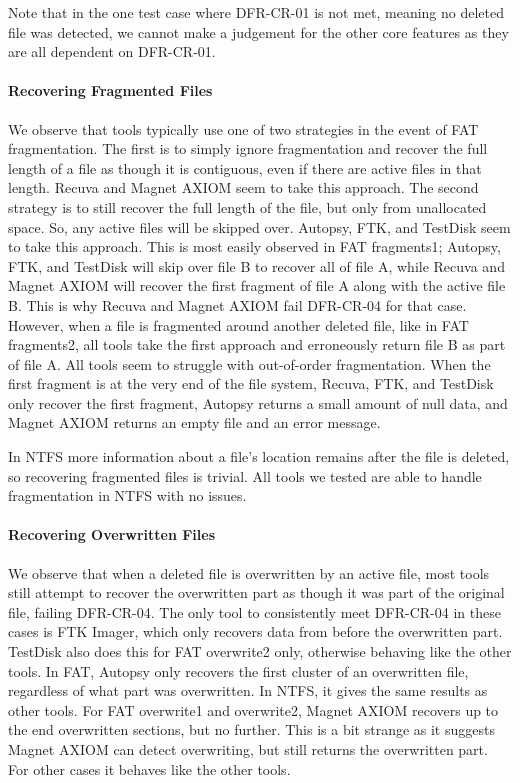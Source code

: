 Note that in the one test case where DFR-CR-01 is not met, meaning no deleted file was detected, we cannot make a judgement for the other core features as they are all dependent on DFR-CR-01.



\paragraph{Recovering Fragmented Files}
We observe that tools typically use one of two strategies in the event of FAT fragmentation.
The first is to simply ignore fragmentation and recover the full length of a file as though it is contiguous, even if there are active files in that length.
Recuva and Magnet AXIOM seem to take this approach.
The second strategy is to still recover the full length of the file, but only from unallocated space.
So, any active files will be skipped over.
Autopsy, FTK, and TestDisk seem to take this approach.
This is most easily observed in FAT fragments1; Autopsy, FTK, and TestDisk will skip over file B to recover all of file A, while Recuva and Magnet AXIOM will recover the first fragment of file A along with the active file B.
This is why Recuva and Magnet AXIOM fail DFR-CR-04 for that case.
However, when a file is fragmented around another deleted file, like in FAT fragments2, all tools take the first approach and erroneously return file B as part of file A.
All tools seem to struggle with out-of-order fragmentation.
When the first fragment is at the very end of the file system, Recuva, FTK, and TestDisk only recover the first fragment, Autopsy returns a small amount of null data, and Magnet AXIOM returns an empty file and an error message.

In NTFS more information about a file's location remains after the file is deleted, so recovering fragmented files is trivial.
All tools we tested are able to handle fragmentation in NTFS with no issues.


\paragraph{Recovering Overwritten Files}
We observe that when a deleted file is overwritten by an active file, most tools still attempt to recover the overwritten part as though it was part of the original file, failing DFR-CR-04.
The only tool to consistently meet DFR-CR-04 in these cases is FTK Imager, which only recovers data from before the overwritten part.
TestDisk also does this for FAT overwrite2 only, otherwise behaving like the other tools.
In FAT, Autopsy only recovers the first cluster of an overwritten file, regardless of what part was overwritten.
In NTFS, it gives the same results as other tools.
For FAT overwrite1 and overwrite2, Magnet AXIOM recovers up to the end overwritten sections, but no further.
This is a bit strange as it suggests Magnet AXIOM can detect overwriting, but still returns the overwritten part.
For other cases it behaves like the other tools.

